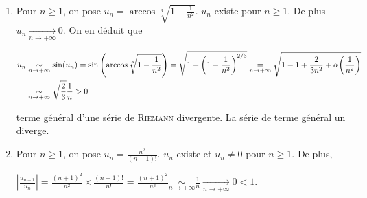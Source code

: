 \documentclass[11pt,a4paper]{article}
\newcommand{\Arccos}{\mathop{\mathrm{arccos}}\nolimits}
\begin{document}
\begin{enumerate}
Vérifions alors que la série de terme général $\frac{1}{n\ln n}$, $n\geqslant2$, diverge. La fonction $x\rightarrow x\ln x$ est continue, croissante et strictement positive sur $]1,+\infty[$ (produit de deux fonctions strictement positives et croissantes sur $]1,+\infty[$). Par suite, la fonction $x\rightarrow\frac{1}{x\ln x}$ est continue et décroissante sur $]1,+\infty[$ et pour tout entier $k$ supérieur ou égal à $2$, 

\begin{center}
$\frac{1}{k\ln k}\geqslant\int_{k}^{k+1}\frac{1}{x\ln x}\;dx$
\end{center}

Par suite, pour $n\geqslant2$, 

\begin{center}
$\sum_{k=2}^{n}\frac{k\ln k}\geqslant\sum_{k=2}^{n}\int_{k}^{k+1}\frac{1}{x\ln x}\;dx=\int_{2}^{n+1}\frac{1}{x\ln x}\;dx=\ln(\ln(n+1)) -\ln(\ln(2)\underset{n\rightarrow+\infty}{\rightarrow}+\infty.$
\end{center}

Donc $u_n$ est positif et équivalent au terme général d'une série divergente. La série de terme général $u_n$ diverge.

\item  Pour $n\geqslant1$, on pose $u_n=\Arccos\sqrt[3]{1-\frac{1}{n^2}}$. $u_n$ existe pour $n\geqslant 1$. De plus $u_n\underset{n\rightarrow+\infty}{\rightarrow}0$. On en déduit que 

\begin{align*}\ensuremath
u_n&\underset{n\rightarrow+\infty}{\sim}\sin(u_n)=\sin\left(\Arccos\sqrt[3]{1-\frac{1}{n^2}}\right) =\sqrt{1-\left(1-\frac{1}{n^2}\right)^{2/3}}\underset{n\rightarrow+\infty}{=}\sqrt{1-1+\frac{2}{3n^2}+o\left(\frac{1}{n^2}\right)}\\
 &\underset{n\rightarrow+\infty}{\sim}\sqrt{\frac{2}{3}}\frac{1}{n}>0
\end{align*}

terme général d'une série de \textsc{Riemann} divergente. La série de terme général un diverge.

\item  Pour $n\geqslant1$, on pose $u_n=\frac{n^2}{(n-1)!}$. $u_n$ existe  et $u_n \neq0$ pour $n\geqslant1$. De plus,

\begin{center}
$\left|\frac{u_{n+1}}{u_n}\right|=\frac{(n+1)^2}{n^2}\times\frac{(n-1)!}{n!}=\frac{(n+1)^2}{n^3}  \underset{n\rightarrow+\infty}{\sim}\frac{1}{n}\underset{n\rightarrow+\infty}{\rightarrow}0< 1$.
\end{center}


\end{enumerate}
\end{document}
